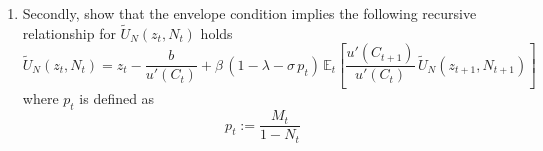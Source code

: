 \documentclass[dvipsnames,11pt]{article}
\begin{document}
\begin{enumerate}
                \begin{solution}
Notice that:
\begin{align*}
    q_t=\frac{M_t}{V_t}=\frac{V_t^{1-\sigma}(1-N_t)^\sigma}{V_t}=V_t^{-\sigma }(1-N_t)^\sigma.
\end{align*}

Then, the first two first order conditions give:
\begin{align*}
    & \mu_t=u'(C_t), \\
    & \psi_t= \frac{\kappa }{q_t} \frac{u'(C_t)}{1-\sigma}.
\end{align*}
Now, combining the latter conditions with the third FOC and defining $\widetilde{U}_N(z_{t},N_{t}) := \frac{1}{u'(C_t)}\,\frac{\partial\,U(z_{t},N_{t})}{\partial\,N_t}$, we obtain:
\begin{align*}
    \frac{\kappa }{q_t} \frac{u'(C_t)}{1-\sigma} = \beta \mathbb{E}_t \left[ u'(C_{t+1}) \widetilde{U}_N(z_{t+1},N_{t+1})\right],
\end{align*}
which can be rearranged as follows:
\begin{align}
    \frac{\kappa}{q_t}=\beta (1-\sigma) \mathbb{E}_t \left[ \frac{u'(C_{t+1})}{u'(C_t)}\widetilde{U}_N(z_{t+1},N_{t+1}) \right]. \label{job_creation}
\end{align}

                    
                    
                \end{solution}

            \item Secondly, show that the envelope condition implies the following recursive relationship for $ \widetilde{U}_N(z_{t},N_{t})$ holds
            $$
            \widetilde{U}_N(z_{t},N_{t})
                = z_t - \frac{b}{u'(C_t)} + \beta\,\left(1-\lambda - \sigma\,p_t\right)\,\mathbb{E}_t\left[\frac{u'(C_{t+1})}{u'(C_t)}\, \widetilde{U}_N(z_{t+1},N_{t+1})\right]
            $$
            where $p_t$ is defined as
            $$ p_t := \frac{M_t}{1-N_t} $$


\end{enumerate}
\end{document}
